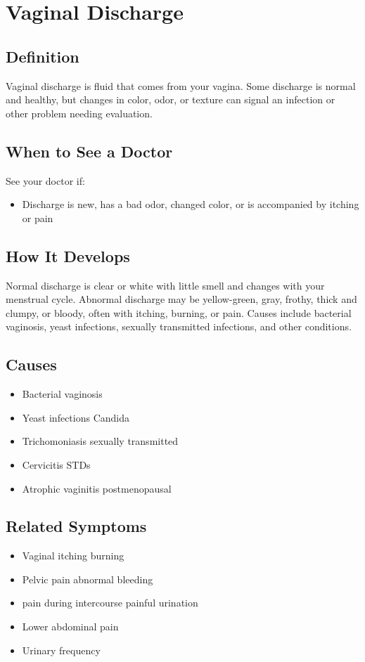 \chapter{Vaginal Discharge}

\section*{Definition}
Vaginal discharge is fluid that comes from your vagina. Some discharge is normal and healthy, but changes in color, odor, or texture can signal an infection or other problem needing evaluation.

\section*{When to See a Doctor}
See your doctor if:
\begin{itemize}
  \item Discharge is new, has a bad odor, changed color, or is accompanied by itching or pain
\end{itemize}

\section*{How It Develops}
Normal discharge is clear or white with little smell and changes with your menstrual cycle. Abnormal discharge may be yellow-green, gray, frothy, thick and clumpy, or bloody, often with itching, burning, or pain. Causes include bacterial vaginosis, yeast infections, sexually transmitted infections, and other conditions.

\section*{Causes}
\begin{itemize}
  \item Bacterial vaginosis
  \item Yeast infections Candida
  \item Trichomoniasis sexually transmitted
  \item Cervicitis STDs
  \item Atrophic vaginitis postmenopausal
\end{itemize}

\section*{Related Symptoms}
\begin{itemize}
  \item Vaginal itching burning
  \item Pelvic pain abnormal bleeding
  \item pain during intercourse painful urination
  \item Lower abdominal pain
  \item Urinary frequency
\end{itemize}

